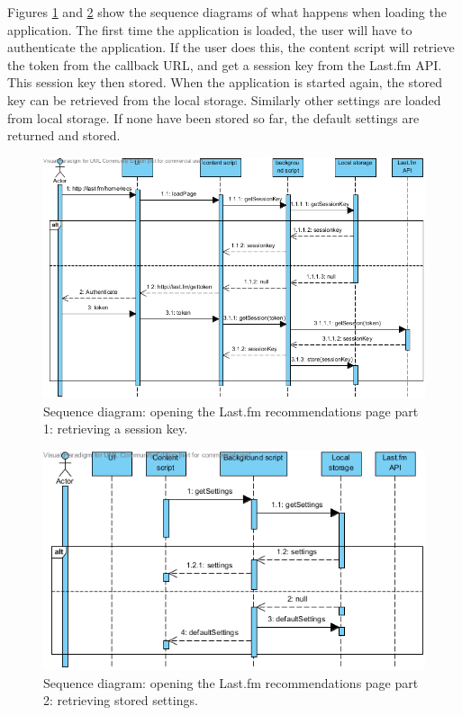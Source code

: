 Figures \ref{fig:sequence:part1} and \ref{fig:sequence:part2} show the sequence diagrams of what happens when loading the application. The first time the application is loaded, the user will have to authenticate the application. If the user does this, the content script will retrieve the token from the callback URL, and get a session key from the Last.fm API. This session key then stored. When the application is started again, the stored key can be retrieved from the local storage. Similarly other settings are loaded from local storage. If none have been stored so far, the default settings are returned and stored.


\begin{figure}%
	\begin{center}
		\includegraphics[width=\columnwidth]{img/seq_part1}%
	\end{center}
	\caption{Sequence diagram: opening the Last.fm recommendations page part 1: retrieving a session key.}%
	\label{fig:sequence:part1}%
\end{figure}

\begin{figure}%
	\begin{center}
		\includegraphics[width=\columnwidth]{img/seq_part2}%
	\end{center}
	\caption{Sequence diagram: opening the Last.fm recommendations page part 2: retrieving stored settings.}%
	\label{fig:sequence:part2}%
\end{figure}



